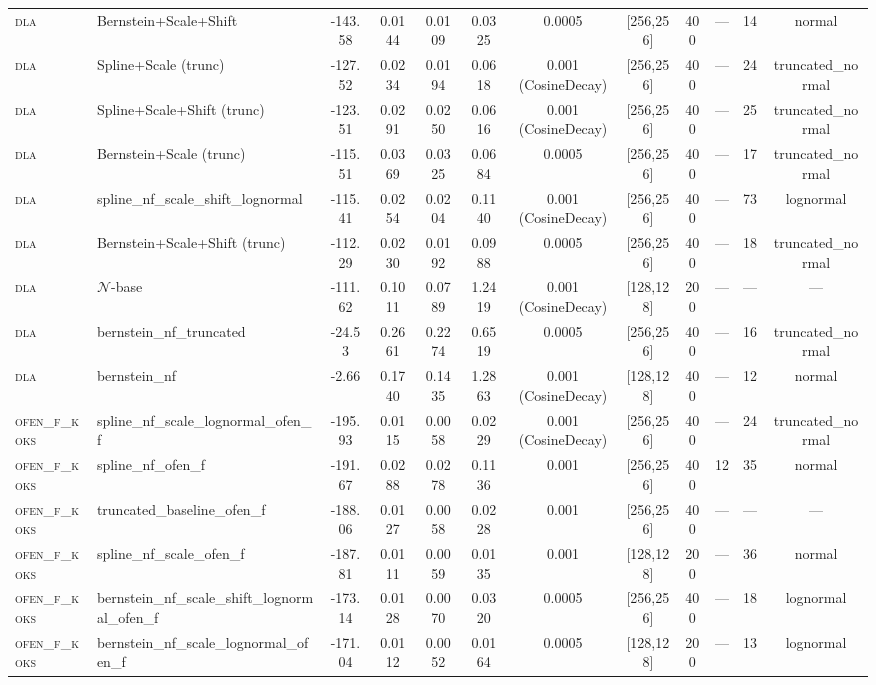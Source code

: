 \begin{table}[htbp]
\begin{tabular}{llS[table-format=-4.2]S[table-format=-4.2]S[table-format=-1.4]S[table-format=-1.4]cccccc}
\textsc{dla} & Bernstein+Scale+Shift & -143.58 & 0.0144 & 0.0109 & 0.0325 & 0.0005 & [256,256] & 400 & — & 14 & normal \\
\textsc{dla} & Spline+Scale (trunc) & -127.52 & 0.0234 & 0.0194 & 0.0618 & 0.001 (CosineDecay) & [256,256] & 400 & — & 24 & truncated_normal \\
\textsc{dla} & Spline+Scale+Shift (trunc) & -123.51 & 0.0291 & 0.0250 & 0.0616 & 0.001 (CosineDecay) & [256,256] & 400 & — & 25 & truncated_normal \\
\textsc{dla} & Bernstein+Scale (trunc) & -115.51 & 0.0369 & 0.0325 & 0.0684 & 0.0005 & [256,256] & 400 & — & 17 & truncated_normal \\
\textsc{dla} & spline_nf_scale_shift_lognormal & -115.41 & 0.0254 & 0.0204 & 0.1140 & 0.001 (CosineDecay) & [256,256] & 400 & — & 73 & lognormal \\
\textsc{dla} & Bernstein+Scale+Shift (trunc) & -112.29 & 0.0230 & 0.0192 & 0.0988 & 0.0005 & [256,256] & 400 & — & 18 & truncated_normal \\
\textsc{dla} & $\mathcal{N}$-base & -111.62 & 0.1011 & 0.0789 & 1.2419 & 0.001 (CosineDecay) & [128,128] & 200 & — & — & — \\
\textsc{dla} & bernstein_nf_truncated & -24.53 & 0.2661 & 0.2274 & 0.6519 & 0.0005 & [256,256] & 400 & — & 16 & truncated_normal \\
\textsc{dla} & bernstein_nf & -2.66 & 0.1740 & 0.1435 & 1.2863 & 0.001 (CosineDecay) & [128,128] & 400 & — & 12 & normal \\
\textsc{ofen\_f\_koks} & spline_nf_scale_lognormal_ofen_f & -195.93 & 0.0115 & 0.0058 & 0.0229 & 0.001 (CosineDecay) & [256,256] & 400 & — & 24 & truncated_normal \\
\textsc{ofen\_f\_koks} & spline_nf_ofen_f & -191.67 & 0.0288 & 0.0278 & 0.1136 & 0.001 & [256,256] & 400 & 12 & 35 & normal \\
\textsc{ofen\_f\_koks} & truncated_baseline_ofen_f & -188.06 & 0.0127 & 0.0058 & 0.0228 & 0.001 & [256,256] & 400 & — & — & — \\
\textsc{ofen\_f\_koks} & spline_nf_scale_ofen_f & -187.81 & 0.0111 & 0.0059 & 0.0135 & 0.001 & [128,128] & 200 & — & 36 & normal \\
\textsc{ofen\_f\_koks} & bernstein_nf_scale_shift_lognormal_ofen_f & -173.14 & 0.0128 & 0.0070 & 0.0320 & 0.0005 & [256,256] & 400 & — & 18 & lognormal \\
\textsc{ofen\_f\_koks} & bernstein_nf_scale_lognormal_ofen_f & -171.04 & 0.0112 & 0.0052 & 0.0164 & 0.0005 & [128,128] & 200 & — & 13 & lognormal \\

\end{tabular}
\end{table}
